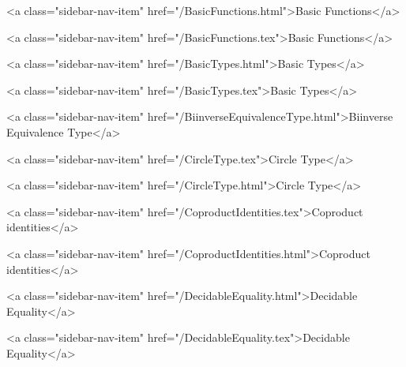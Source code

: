       
    
      
        
          <a class="sidebar-nav-item" href="/BasicFunctions.html">Basic Functions</a>
        
      
    
      
        
          <a class="sidebar-nav-item" href="/BasicFunctions.tex">Basic Functions</a>
        
      
    
      
        
          <a class="sidebar-nav-item" href="/BasicTypes.html">Basic Types</a>
        
      
    
      
        
          <a class="sidebar-nav-item" href="/BasicTypes.tex">Basic Types</a>
        
      
    
      
        
          <a class="sidebar-nav-item" href="/BiinverseEquivalenceType.html">Biinverse Equivalence Type</a>
        
      
    
      
        
          <a class="sidebar-nav-item" href="/CircleType.tex">Circle Type</a>
        
      
    
      
        
          <a class="sidebar-nav-item" href="/CircleType.html">Circle Type</a>
        
      
    
      
        
          <a class="sidebar-nav-item" href="/CoproductIdentities.tex">Coproduct identities</a>
        
      
    
      
        
          <a class="sidebar-nav-item" href="/CoproductIdentities.html">Coproduct identities</a>
        
      
    
      
        
          <a class="sidebar-nav-item" href="/DecidableEquality.html">Decidable Equality</a>
        
      
    
      
        
          <a class="sidebar-nav-item" href="/DecidableEquality.tex">Decidable Equality</a>
        
